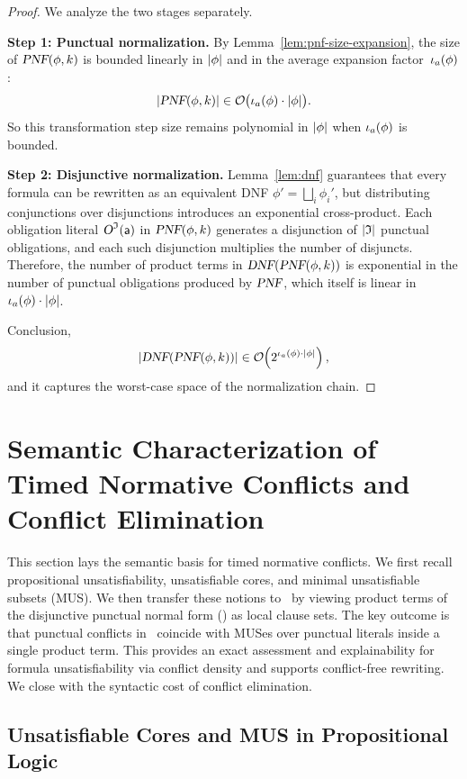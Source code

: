 \begin{proof}
We analyze the two stages separately.

\textbf{Step 1: Punctual normalization.}
By Lemma~\ref{lem:pnf-size-expansion}, the size of $\textsl{PNF}(\phi,k)$ is bounded linearly in
$\vert \phi\vert$ and in the average expansion factor~$\iota_a(\phi)$:
\[
\size{\pnf(\phi,k)}\in\mathcall{O}\big(\expf_a(\phi)\cdot\size{\phi}\big).
\]
So this transformation step size remains polynomial in $\vert \phi\vert$ when $\iota_a(\phi)$ is bounded.

\textbf{Step 2: Disjunctive normalization.}
Lemma~\ref{lem:dnf} guarantees that every formula can be rewritten as an equivalent DNF
$\phi'=\bigsqcup_i\phi_i'$, but distributing conjunctions over disjunctions introduces an
exponential cross-product. Each obligation literal $\textsl{O}^{\mathfrak{I}}(\mathsf{a})$ in $\textsl{PNF}(\phi,k)$ generates a
disjunction of $\vert \mathfrak{I}\vert$ punctual obligations, and each such disjunction multiplies the
number of disjuncts. Therefore, the number of product terms in
$\textsl{DNF}(\textsl{PNF}(\phi,k))$ is exponential in the number of punctual obligations produced by $\textsl{PNF}$,
which itself is linear in $\iota_a(\phi)\cdot\vert \phi\vert$.

Conclusion,
\[
\size{\dnf(\pnf(\phi,k))}\in
\mathcall{O}\!\left(2^{\expf_a(\phi)\cdot\size{\phi}}\right),
\]
and it captures  the worst-case space of the normalization chain.
\end{proof}


\section{Semantic Characterization of Timed Normative Conflicts and Conflict Elimination}\label{sec:unsat-conflicts}

This section lays the semantic basis for timed normative conflicts. We first recall propositional unsatisfiability, unsatisfiable cores, and minimal unsatisfiable subsets (MUS). We then transfer these notions to \TDDLfm\ by viewing product terms of the disjunctive punctual normal form (\dpnf) as local clause sets. The key outcome is that punctual conflicts in \TDDLfm\ coincide with MUSes over punctual literals inside a single product term. This provides an exact assessment and explainability for formula unsatisfiability via conflict density and supports conflict-free rewriting. We close with the syntactic cost of conflict elimination.

\subsection{Unsatisfiable Cores and MUS in Propositional Logic}

